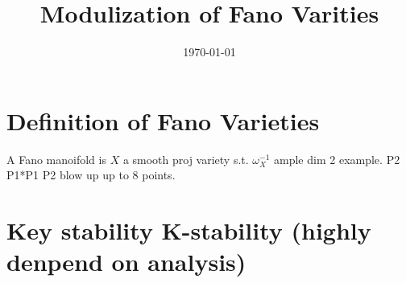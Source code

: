 \documentclass[11pt]{article}
\date{\today}
\title{Modulization of Fano Varities}
\begin{document}
\maketitle
\setcounter{secnumdepth}{-1}

\section{Definition of Fano Varieties}
\label{sec-1}
A Fano manoifold is $X$ a smooth proj variety s.t. $\omega_{X}^{-1}$ ample
  dim 2 example. P2 P1*P1 P2 blow up up to 8 points.

\section{Key stability K-stability (highly denpend on analysis)}
\label{sec-2}
\end{document}
